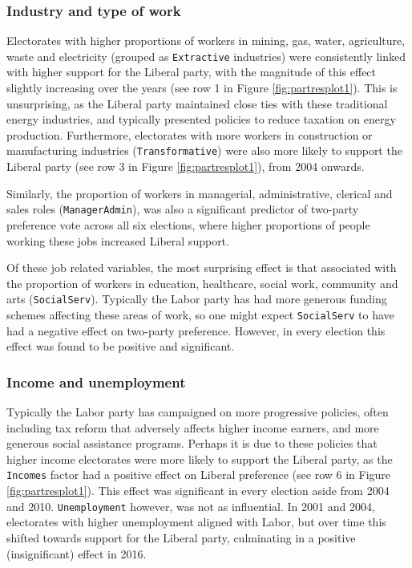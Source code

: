 \documentclass[
  times, doublespace]{anzsauth}
\begin{document}
\hypertarget{industry-and-type-of-work}{%
\subsubsection*{Industry and type of work}\label{industry-and-type-of-work}}

Electorates with higher proportions of workers in mining, gas, water, agriculture, waste and electricity (grouped as \texttt{Extractive} industries) were consistently linked with higher support for the Liberal party, with the magnitude of this effect slightly increasing over the years (see row 1 in Figure \ref{fig:partresplot1}). This is unsurprising, as the Liberal party maintained close ties with these traditional energy industries, and typically presented policies to reduce taxation on energy production. Furthermore, electorates with more workers in construction or manufacturing industries (\texttt{Transformative}) were also more likely to support the Liberal party (see row 3 in Figure \ref{fig:partresplot1}), from 2004 onwards.

Similarly, the proportion of workers in managerial, administrative, clerical and sales roles (\texttt{ManagerAdmin}), was also a significant predictor of two-party preference vote across all six elections, where higher proportions of people working these jobs increased Liberal support.

Of these job related variables, the most surprising effect is that associated with the proportion of workers in education, healthcare, social work, community and arts (\texttt{SocialServ}). Typically the Labor party has had more generous funding schemes affecting these areas of work, so one might expect \texttt{SocialServ} to have had a negative effect on two-party preference. However, in every election this effect was found to be positive and significant.

\hypertarget{income-and-unemployment}{%
\subsubsection*{Income and unemployment}\label{income-and-unemployment}}

Typically the Labor party has campaigned on more progressive policies, often including tax reform that adversely affects higher income earners, and more generous social assistance programs. Perhaps it is due to these policies that higher income electorates were more likely to support the Liberal party, as the \texttt{Incomes} factor had a positive effect on Liberal preference (see row 6 in Figure \ref{fig:partresplot1}). This effect was significant in every election aside from 2004 and 2010. \texttt{Unemployment} however, was not as influential. In 2001 and 2004, electorates with higher unemployment aligned with Labor, but over time this shifted towards support for the Liberal party, culminating in a positive (insignificant) effect in 2016.
\end{document}
